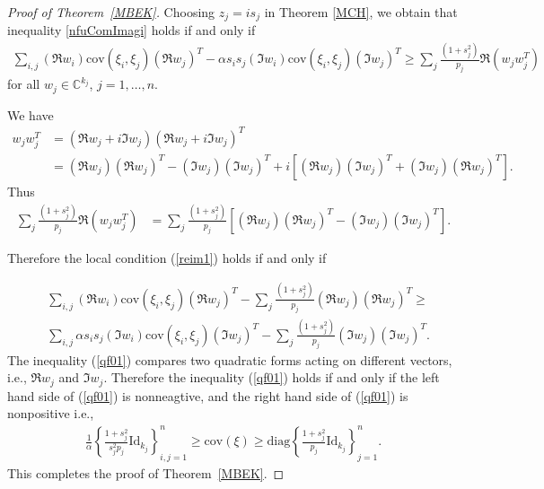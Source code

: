 \documentclass[9pt, a4paper]{amsart}
\newcommand{\C}{\mathbb{C}}
\newcommand{\1}{{\chi_{}}}%
\numberwithin{equation}{section}
\begin{document}
\begin{proof}[Proof of Theorem~\ref{MBEK}]
	Choosing $z_j=is_j$ in Theorem \ref{MCH}, we obtain that inequality \eqref{nfuComImagi} holds if and only if 
	\begin{align}\label{reim1}
		\sum_{i,j}(\Re w_{i})\mathrm{cov}(\xi_{i}, \xi_{j}) (\Re w_{j})^{T} - \alpha s_is_j(\Im w_{i}) \mathrm{cov}(\xi_{i}, \xi_{j}) (\Im w_{j})^{T} \geq \sum_j \frac{(1 + s_j^2)}{p_j}\Re(w_j w_j^T) 
	\end{align}
	for all $w_j\in\C^{k_j}$, $j=1,\ldots,n$. 
    
We have
	\begin{align*}
		w_j w_j^T &= (\Re w_j + i \Im w_j)(\Re w_j + i \Im w_j)^T\\
		&=(\Re w_j)(\Re w_j)^T - (\Im w_j)(\Im w_j)^T + i \left[ (\Re w_j)(\Im w_j)^T + (\Im w_j)(\Re w_j)^T \right].
	\end{align*}
    Thus 
    \begin{align*}
		\sum_j \frac{(1 + s_j^2)}{p_j}\Re(w_j w_j^T)&=	 \sum_j \frac{(1 + s_j^2)}{p_j} \left[ (\Re w_j)(\Re w_j)^T - (\Im w_j)(\Im w_j)^T \right].
        \end{align*}

    Therefore the local condition (\ref{reim1}) holds if and only if 
    
    \begin{align}
    &\sum_{i,j}(\Re w_{i})\mathrm{cov}(\xi_{i}, \xi_{j}) (\Re w_{j})^{T}     - \sum_j \frac{(1 + s_j^2)}{p_j} (\Re w_j)(\Re w_j)^T \geq \label{qf01}\\
    &\sum_{i,j}\alpha s_is_j(\Im w_{i}) \mathrm{cov}(\xi_{i}, \xi_{j}) (\Im w_{j})^{T} - \sum_j \frac{(1 + s_j^2)}{p_j} (\Im w_j)(\Im w_j)^T. \nonumber
    \end{align}
The inequality (\ref{qf01}) compares two quadratic forms acting on different vectors, i.e., $\Re w_{j}$ and $\Im w_{j}$. Therefore the inequality (\ref{qf01}) holds if and only if the left hand side of (\ref{qf01}) is nonneagtive, and the right hand side of (\ref{qf01}) is nonpositive i.e., 
\begin{align*}
   \frac{1}{\alpha} \left\{ \frac{1+s_j^2}{s_j^2p_j}\mathrm{Id}_{k_j} \right\}_{i,j=1}^{n} \geq \mathrm{cov}(\xi)  \geq \mathrm{diag}\left\{ \frac{1+s_{j}^{2}}{p_{j}}\mathrm{Id}_{k_{j}} \right\}_{j=1}^{n}.
\end{align*}
This completes the proof of Theorem~\ref{MBEK}.
\end{proof}
\end{document}
